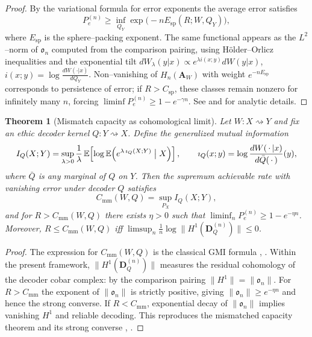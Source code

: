 \documentclass[12pt]{article}
\theoremstyle{plain}
\newtheorem{theorem}{Theorem}[section]
\theoremstyle{definition}
\theoremstyle{remark}
\numberwithin{equation}{section}
\begin{document}
\begin{proof}
By the variational formula for error exponents \cite{CsiszarKorner2011} the average error satisfies
\[
P_e^{(n)}\ge
\inf_{Q_Y}\exp\big(-nE_{\mathrm{sp}}(R;W,Q_Y)\big),
\]
where $E_{\mathrm{sp}}$ is the sphere--packing exponent.  
The same functional appears as the $L^2$--norm of $\mathfrak o_n$ computed from the comparison pairing, using Hölder--Orlicz inequalities and the exponential tilt $dW_\lambda(y|x)\propto e^{\lambda i(x;y)}dW(y|x)$, $i(x;y)=\log\frac{dW(\cdot|x)}{dQ_Y}$.  
Non--vanishing of $H_n(\mathbf A_W)$ with weight $e^{-nE_{\mathrm{sp}}}$ corresponds to persistence of error; if $R>C_{\mathrm{sp}}$, these classes remain nonzero for infinitely many $n$, forcing $\liminf P_e^{(n)}\ge 1-e^{-\gamma n}$.  
See \cite{CsiszarKorner2011} and \cite{Gallager1968} for analytic details.
\end{proof}

\begin{theorem}[Mismatch capacity as cohomological limit]\label{thm:mismatch}
Let $W:X\rightsquigarrow Y$ and fix an ethic decoder kernel $Q:Y\rightsquigarrow X$.  
Define the generalized mutual information
\[
I_Q(X;Y)=
\sup_{\lambda>0}
\frac{1}{\lambda}\,
\mathbb E\!\left[\log
\mathbb E\!\left(e^{\lambda\,\imath_Q(X;Y)}\bigm|X\right)
\right],
\qquad
\imath_Q(x;y)=\log\frac{dW(\,\cdot\,|x)}{d\bar Q(\,\cdot\,)}(y),
\]
where $\bar Q$ is any marginal of $Q$ on $Y$.  
Then the supremum achievable rate with vanishing error under decoder $Q$ satisfies
\[
C_{\mathrm{mm}}(W,Q)
=\sup_{P_X} I_Q(X;Y),
\]
and for $R>C_{\mathrm{mm}}(W,Q)$ there exists $\eta>0$ such that $\liminf_n P_e^{(n)}\ge 1-e^{-\eta n}$.  
Moreover, $R\le C_{\mathrm{mm}}(W,Q)$ iff $\limsup_n\frac1n\log \|H^1(\mathbf D_Q^{(n)})\|\le 0$.
\end{theorem}

\begin{proof}
The expression for $C_{\mathrm{mm}}(W,Q)$ is the classical GMI formula \cite{Lapidoth1996}, \cite{MerhavLapidoth1996}.  
Within the present framework, $\|H^1(\mathbf D_Q^{(n)})\|$ measures the residual cohomology of the decoder cobar complex: by the comparison pairing $\|H^1\|=\|\mathfrak o_n\|$.  
For $R>C_{\mathrm{mm}}$ the exponent of $\|\mathfrak o_n\|$ is strictly positive, giving $\|\mathfrak o_n\|\ge e^{-\eta n}$ and hence the strong converse.  
If $R<C_{\mathrm{mm}}$, exponential decay of $\|\mathfrak o_n\|$ implies vanishing $H^1$ and reliable decoding.  
This reproduces the mismatched capacity theorem and its strong converse \cite{MerhavLapidoth1996}, \cite{CsiszarKorner2011}.
\end{proof}
\end{document}
